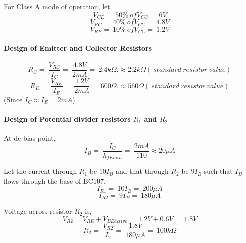 \noindent For Class A mode of operation, let
\begin{equation}
V_{CE}=\ 50\% \ of V_{CC}=\ 6 V
\end{equation}
\begin{equation}
V_{RC}=\ 40\% \ of V_{CC}=\ 4.8 V
\end{equation}
\begin{equation}
V_{RE}=\ 10\% \ of V_{CC}=\ 1.2 V
\end{equation}

 \paragraph{Design of Emitter and Collector Resistors}
 
\begin{equation}
R_C=\ \frac{V_{RC}}{I_C}=\ \frac{4.8V}{2mA}=\ 2.4 k \Omega. \approx 2.2k\Omega (\ standard \ resistor\  value)
\end{equation}
\begin{equation}
R_E=\ \frac{V_{RE}}{I_E}=\ \frac{1.2V}{2mA}=\ 600 \Omega. \approx 560\Omega (\ standard \ resistor \ value)
\end{equation}
\noindent (Since $I_C \approx I_E =2mA$)

\paragraph{Design of Potential divider resistors $R_1$ and $R_2$ \\}
\noindent At dc bias point,
\begin{equation}
I_B=\ \frac{I_C}{h_{fEmin}}=\ \frac{2mA}{110} \approx 20 \mu A
\end{equation}

\noindent Let the current through $R_1$ be $10I_B$ and that through $R_2$ be $9I_B$ such that $I_B$ flows through the base of BC107.
\begin{equation}
I_{R1}=\ 10I_B=\ 200 \mu A
\end{equation}
\begin{equation}
I_{R2}=\ 9I_B=\ 180 \mu A
\end{equation}



\noindent Voltage across resistor $R_2$ is,
\begin{equation}
V_{R2}= V_{RE} +V_{BEactive} =\ 1.2V+0.6V=\ 1.8 V
\end{equation}
 \begin{equation}
R_2=\ \frac{V_{R2}}{I_2}= \ \frac{1.8V}{180 \mu A}=\ 100k\Omega
\end{equation}

